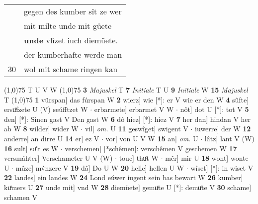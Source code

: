 \documentclass[8pt,a4paper,notitlepage]{article}
\begin{document}
\begin{table}[ht]
\begin{minipage}[t]{0.5\linewidth}
\begin{tabular}{rl}
 & gegen des kumber sît ze wer\\ 
 & mit milte unde mit güete\\ 
 & \textbf{unde} vlîzet iuch diemüete.\\ 
 & der kumberhafte werde man\\ 
30 & wol mit schame ringen kan\\ 
\end{tabular}
\scriptsize
\line(1,0){75} \newline
T U V W \newline
\line(1,0){75} \newline
\textbf{3} \textit{Majuskel} T  \textbf{7} \textit{Initiale} T U  \textbf{9} \textit{Initiale} W  \textbf{15} \textit{Majuskel} T  \newline
\line(1,0){75} \newline
\textbf{1} vürspan] das fúrspan W \textbf{2} wierz] wie [*]: er V wie er den W \textbf{4} sûfte] ersuͦfzete U (V) seúfftzet W  $\cdot$ erbarmete] erbarmet V W  $\cdot$ nôt] dot U [*]: tot V \textbf{5} den] [*]: Sinen gast V Den gast W \textbf{6} dô hiez] [*]: hiez V \textbf{7} her dan] hindan V her ab W \textbf{8} wilder] wider W  $\cdot$ vil] \textit{om.} U \textbf{11} geswîget] swigent V  $\cdot$ iuwerre] der W \textbf{12} anderre] an dirre U \textbf{14} er] ez V  $\cdot$ vor] von U V W \textbf{15} an] \textit{om.} U  $\cdot$ lâtz] lant V (W) \textbf{16} sult] soͤlt es W  $\cdot$ verschemen] [*schêmen]: verschêmen V geschemen W \textbf{17} versmâhter] Verschameter U V (W)  $\cdot$ touc] thuͦt W  $\cdot$ mêr] mir U \textbf{18} wont] wonte U  $\cdot$ mûze] mv́nzere V \textbf{19} dâ] Do U W \textbf{20} helle] hellen U W  $\cdot$ wîset] [*]: in wiset V \textbf{22} landes] ein landes W \textbf{24} Lond eúwer iugent sein bas bewart W \textbf{26} kumber] kuͦmers U \textbf{27} unde mit] vnd W \textbf{28} diemüete] gemuͦte U [*]: demuͤte V \textbf{30} schame] schamen V \newline
\end{minipage}
\end{table}
\end{document}

